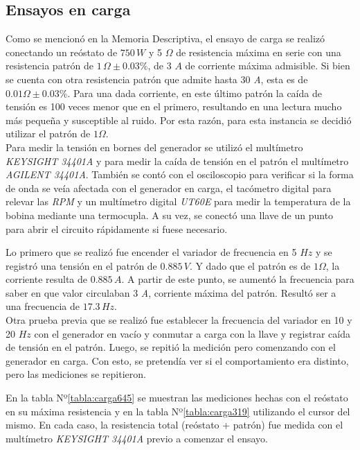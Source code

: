 \documentclass[a4paper,11pt,twoside]{IT-CNEA}
\begin{document}
\subsection{Ensayos en carga}
Como se mencionó en la Memoria Descriptiva, el ensayo de carga se realizó conectando un reóstato de $750\,W$ y 5 $\varOmega$ de resistencia máxima en serie con una resistencia patrón de $1\,\varOmega\pm0.03\%$, de 3 $A$ de corriente máxima admisible. Si bien se cuenta con otra resistencia patrón que admite hasta 30 \textit{A}, esta es de $0.01\varOmega\pm 0.03\%$. Para una dada corriente, en este último patrón la caída de tensión es 100 veces menor que en el primero, resultando en una lectura mucho más pequeña y susceptible al ruido. Por esta razón, para esta instancia se decidió utilizar el patrón de $1\varOmega$.
\\Para medir la tensión en bornes del generador se utilizó el multímetro \textit{KEYSIGHT 34401A} y para medir la caída de tensión en el patrón el multímetro \textit{AGILENT 34401A}. También se contó con el osciloscopio para verificar si la forma de onda se veía afectada con el generador en carga, el tacómetro digital para relevar las \textit{RPM} y un multímetro digital \textit{UT60E} para medir la temperatura de la bobina mediante una termocupla. 
A su vez, se conectó una llave de un punto para abrir el circuito rápidamente si fuese necesario.
\par Lo primero que se realizó fue encender el variador de frecuencia en 5 $Hz$ y se registró una tensión en el patrón de $0.885\,V$. Y dado que el patrón es de $1\varOmega$, la corriente resulta de $0.885\,A$. A partir de este punto, se aumentó la frecuencia para saber en que valor circulaban 3 \textit{A}, corriente máxima del patrón. Resultó ser a una frecuencia de $17.3\,Hz$. 
\\ Otra prueba previa que se realizó fue establecer la frecuencia del variador en 10 y 20 $Hz$ con el generador en vacío y conmutar a carga con la llave y registrar caída de tensión en el patrón. Luego, se repitió la medición pero comenzando con el generador en carga. Con esto, se pretendía ver si el comportamiento era distinto, pero las mediciones se repitieron.
\par En la tabla Nº\ref{tabla:carga645} se muestran las mediciones hechas con el reóstato en su máxima resistencia y en la tabla Nº\ref{tabla:carga319} utilizando el cursor del mismo. En cada caso, la resistencia total (reóstato + patrón) fue medida con el multímetro \textit{KEYSIGHT 34401A} previo a comenzar el ensayo.
\end{document}
